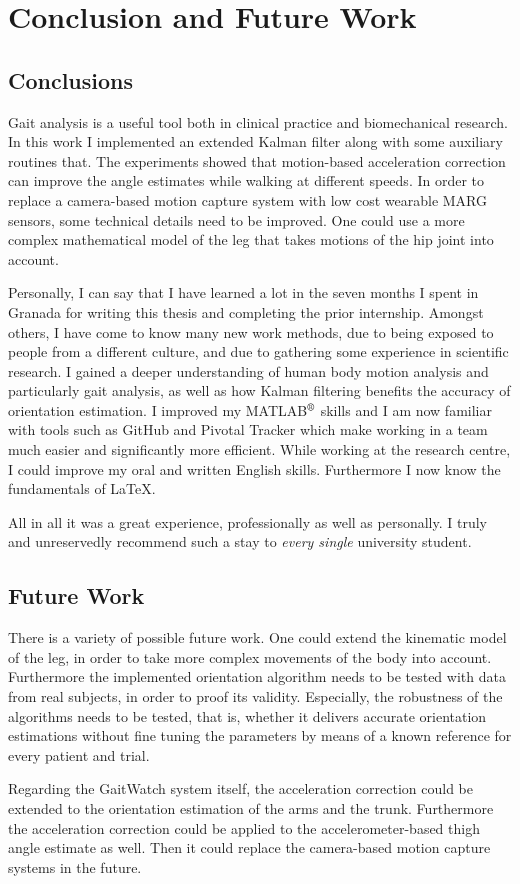\chapter{Conclusion and Future Work}
\label{ch:Conclusion and Future Work}

\section{Conclusions}

Gait analysis is a useful tool both in clinical practice and biomechanical research. In this work I implemented an extended Kalman filter along with some auxiliary routines that. The experiments showed that motion-based acceleration correction can improve the angle estimates while walking at different speeds. In order to replace a camera-based motion capture system with low cost wearable MARG sensors, some technical details need to be improved. One could use a more complex mathematical model of the leg that takes motions of the hip joint into account.

Personally, I can say that I have learned a lot in the seven months I spent in Granada for writing this thesis and completing the prior internship. Amongst others, I have come to know many new work methods, due to being exposed to people from a different culture, and due to gathering some experience in scientific research. I gained a deeper understanding of human body motion analysis and particularly gait analysis, as well as how Kalman filtering benefits the accuracy of orientation estimation. I improved my MATLAB$\textsuperscript{\textregistered}$ skills and I am now familiar with tools such as GitHub and Pivotal Tracker which make working in a team much easier and significantly more efficient.  While working at the research centre, I could improve my oral and written English skills. Furthermore I now know the fundamentals of \LaTeX{}.

All in all it was a great experience, professionally as well as personally. I truly and unreservedly recommend such a stay to \emph{every single} university student.

\section{Future Work}

There is a variety of possible future work. One could extend the kinematic model of the leg, in order to take more complex movements of the body into account. Furthermore the implemented orientation algorithm needs to be tested with data from real subjects, in order to proof its validity. Especially, the robustness of the algorithms needs to be tested, that is, whether it delivers accurate orientation estimations without fine tuning the parameters by means of a known reference for every patient and trial.

Regarding the GaitWatch system itself, the acceleration correction could be extended to the orientation estimation of the arms and the trunk. Furthermore the acceleration correction could be applied to the accelerometer-based thigh angle estimate as well. Then it could replace the camera-based motion capture systems in the future.


